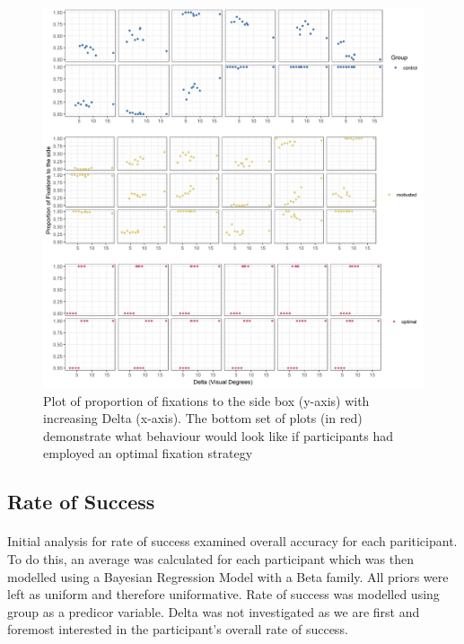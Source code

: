 \documentclass[12pt]{article}
\begin{document}
\begin{figure}[ht!]
	\includegraphics[scale=0.7]{../Figures/Part_2_all_groups.png}
	\centering
	\captionsetup{justification=centering}
	\caption{Plot of proportion of fixations to the side box (y-axis) with increasing Delta (x-axis). The bottom set of plots (in red) demonstrate what behaviour would look like if participants had employed an optimal fixation strategy}
	\label{fig:Position_raw}
\end{figure}

\subsection*{Rate of Success} 
\paragraph{} Initial analysis for rate of success examined overall accuracy for each pariticipant. To do this, an average was calculated for each participant which was then modelled using a Bayesian Regression Model with a Beta family. All priors were left as uniform and therefore uniformative. Rate of success was modelled using group as a predicor variable. Delta was not investigated as we are first and foremost interested in the participant's overall rate of success. 
\end{document}
